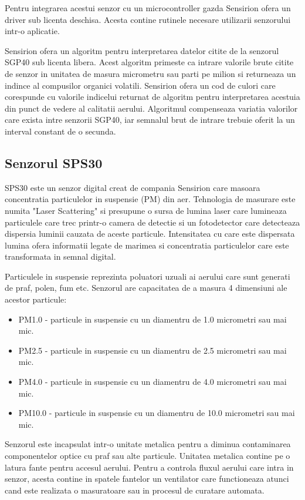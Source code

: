Pentru integrarea acestui senzor cu un microcontroller gazda Sensirion ofera un driver sub licenta deschisa. Acesta contine rutinele necesare utilizarii senzorului 
intr-o aplicatie.

Sensirion ofera un algoritm pentru interpretarea datelor citite de la senzorul SGP40 sub licenta libera. Acest algoritm primeste ca intrare valorile brute citite de 
senzor in unitatea de masura micrometru sau parti pe milion si returneaza un indince al compusilor organici volatili. Sensirion ofera un cod de culori care corespunde 
cu valorile indicelui returnat de algoritm pentru interpretarea acestuia din punct de vedere al calitatii aerului. Algoritmul compenseaza variatia valorilor care exista 
intre senzorii SGP40, iar semnalul brut de intrare trebuie oferit la un interval constant de o secunda.

\subsection{Senzorul SPS30}\label{subsec:af_sps30}
SPS30 \cite{sps30} este un senzor digital creat de compania Sensirion care masoara concentratia particulelor in suspensie (PM) din aer. Tehnologia de masurare este numita 
"Laser Scattering" si presupune o sursa de lumina laser care lumineaza particulele care trec printr-o camera de detectie si un fotodetector care detecteaza 
dispersia luminii cauzata de aceste particule. Intensitatea cu care este dispersata lumina ofera informatii legate de marimea si concentratia particulelor care 
este transformata in semnal digital.

Particulele in suspensie reprezinta poluatori uzuali ai aerului care sunt generati de praf, polen, fum etc. Senzorul are capacitatea de a masura 4 dimensiuni ale 
acestor particule:
\begin{itemize}
	\item PM1.0 - particule in suspensie cu un diamentru de 1.0 micrometri sau mai mic.
	\item PM2.5 - particule in suspensie cu un diamentru de 2.5 micrometri sau mai mic.
	\item PM4.0 - particule in suspensie cu un diamentru de 4.0 micrometri sau mai mic.
	\item PM10.0 - particule in suspensie cu un diamentru de 10.0 micrometri sau mai mic.
\end{itemize}

Senzorul este incapsulat intr-o unitate metalica pentru a diminua contaminarea componentelor optice cu praf sau alte particule. Unitatea metalica contine pe o latura 
fante pentru accesul aerului. Pentru a controla fluxul aerului care intra in senzor, acesta contine in spatele fantelor un ventilator care functioneaza atunci cand este 
realizata o masuratoare sau in procesul de curatare automata.


